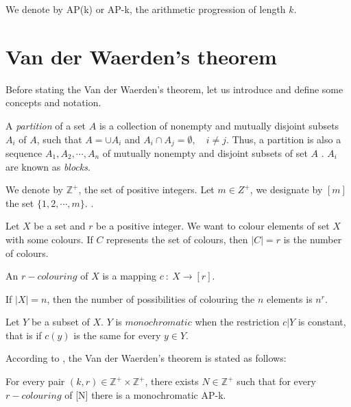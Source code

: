 We denote by AP(k) or AP-k, the arithmetic progression of length $k.$


\section{Van der Waerden's theorem}

Before stating the Van der Waerden's theorem, let us introduce and define some concepts and notation.

A \textit{partition} of a set $A$ is a collection of nonempty and mutually disjoint subsets $A_i$ of $A$, such that  $A=\cup A_i$ and $A_i \cap A_j=\emptyset, \quad i\neq j.$ Thus, a partition is also a sequence $A_1, A_2, \cdots, A_n$ of mutually nonempty and  disjoint subsets of set $A$ \citep{dransfield2004}. $A_i$ are known as \textit{blocks}.

We denote by $\mathbb{Z}^+$, the set of positive integers.
Let $m \in \mathit{Z}^+$, we designate by $[m]$ the set $\{1,2, \cdots, m\}.$
.

Let $X$ be a set and $r$ be a positive integer. We want to colour elements of set $X$ with some colours. If $C$ represents the set of colours, then $|C|=r$ is the number of colours.

\begin{defn} An $r-colouring$ of $X$ is a mapping $c \ : \ X \longrightarrow [r].$  \label{rcol}\end{defn}


If $|X|=n$, then the number of possibilities of colouring the $n$ elements is $n^r.$


Let $Y$ be a subset of $X.$ $Y$ is $monochromatic$ when the restriction $c|Y$ is constant, that is   if $c(y)$ is the same for every $y \in Y.$


According to \cite{Polymath2009new} , the Van der Waerden's theorem is stated as follows:

\begin{thm}
For every pair $(k,r) \in \mathbb{Z}^+ \times \mathbb{Z}^+$, there exists $N \in \mathbb{Z}^+$ such that for
every $r-colouring$ of [N] there is a monochromatic AP-k.  \label{vd1}
\end{thm}

